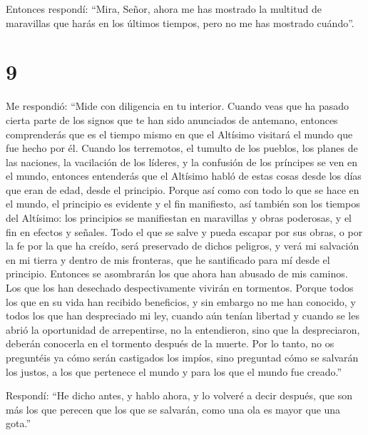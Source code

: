 Entonces respondí:  ``Mira, Señor, ahora me has mostrado
la multitud de maravillas que harás en los últimos tiempos, pero no me
has mostrado cuándo''.

\hypertarget{section-8}{%
\section{9}\label{section-8}}

 Me respondió: ``Mide con diligencia en tu interior.
Cuando veas que ha pasado cierta parte de los signos que te han sido
anunciados de antemano,  entonces comprenderás que es el
tiempo mismo en que el Altísimo visitará el mundo que fue hecho por él.
 Cuando los terremotos, el tumulto de los pueblos, los
planes de las naciones, la vacilación de los líderes, y la confusión de
los príncipes se ven en el mundo,  entonces entenderás que
el Altísimo habló de estas cosas desde los días que eran de edad, desde
el principio.  Porque así como con todo lo que se hace en
el mundo, el principio es evidente y el fin manifiesto, 
así también son los tiempos del Altísimo: los principios se manifiestan
en maravillas y obras poderosas, y el fin en efectos y señales.
 Todo el que se salve y pueda escapar por sus obras, o por
la fe por la que ha creído,  será preservado de dichos
peligros, y verá mi salvación en mi tierra y dentro de mis fronteras,
que he santificado para mí desde el principio.  Entonces
se asombrarán los que ahora han abusado de mis caminos. Los que los han
desechado despectivamente vivirán en tormentos.  Porque
todos los que en su vida han recibido beneficios, y sin embargo no me
han conocido,  y todos los que han despreciado mi ley,
cuando aún tenían libertad y cuando se les abrió la oportunidad de
arrepentirse, no la entendieron, sino que la despreciaron,
 deberán conocerla en el tormento después de la muerte.
 Por lo tanto, no os preguntéis ya cómo serán castigados
los impíos, sino preguntad cómo se salvarán los justos, a los que
pertenece el mundo y para los que el mundo fue creado.''

 Respondí:  ``He dicho antes, y hablo
ahora, y lo volveré a decir después, que son más los que perecen que los
que se salvarán,  como una ola es mayor que una gota.''

